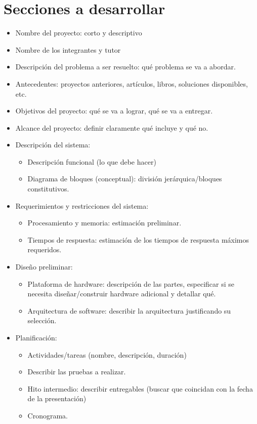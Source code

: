 \documentclass[a4paper,12pt]{article}
\begin{document}
\begin{linenumbers}
\begin{tcolorbox}
  \end{tcolorbox}


  \newpage
  \setcounter{page}{1}
  \tableofcontents

  \newpage

\section{Secciones a desarrollar}
\begin{itemize}
  \item Nombre del proyecto: corto y descriptivo
  \item Nombre de los integrantes y tutor
  \item Descripción del problema a ser resuelto: qué problema se va a abordar.
  \item Antecedentes: proyectos anteriores, artículos, libros, soluciones disponibles, etc.
  \item Objetivos del proyecto: qué se va a lograr, qué se va a entregar.
  \item Alcance del proyecto: definir claramente qué incluye y qué no.
  \item Descripción del sistema:
  \begin{itemize}
      \item Descripción funcional (lo que debe hacer)
      \item Diagrama de bloques (conceptual): división jerárquica/bloques constitutivos.
  \end{itemize}
  \item Requerimientos y restricciones del sistema:
  \begin{itemize}
      \item Procesamiento y memoria: estimación preliminar.
      \item Tiempos de respuesta: estimación de los tiempos de respuesta máximos requeridos.
  \end{itemize}
  \item Diseño preliminar:
  \begin{itemize}
      \item Plataforma de hardware: descripción de las partes, especificar si se necesita diseñar/construir hardware adicional y detallar qué.
      \item Arquitectura de software: describir la arquitectura justificando su selección.
  \end{itemize}
  \item Planificación:
  \begin{itemize}
      \item Actividades/tareas (nombre, descripción, duración)
      \item Describir las pruebas a realizar.
      \item Hito intermedio: describir entregables (buscar que coincidan con la fecha de la presentación)
      \item Cronograma.
  \end{itemize}
\end{itemize}



\end{linenumbers}
\end{document}
